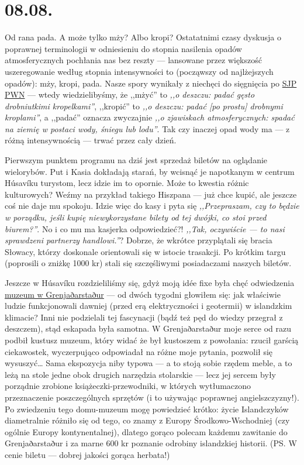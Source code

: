 \chapter*{08.08.}

Od rana pada. A może tylko mży? Albo kropi? Ostatatnimi czasy dyskusja o poprawnej terminologii w odniesieniu do stopnia nasilenia opadów atmosferycznych pochłania nas bez reszty --- lansowane przez większość uszeregowanie według stopnia intensywności to (począwszy od najlżejszych opadów): mży, kropi, pada. Nasze spory wynikały z niechęci do sięgnięcia po \href{http://sjp.pwn.pl/}{SJP PWN} --- wtedy wiedzielibyśmy, że ,,mżyć'' to \emph{,,o deszczu: padać gęsto drobniutkimi kropelkami''}, ,,kropić'' to \emph{,,o deszczu: padać [po prostu] drobnymi kroplami''}, a ,,padać'' oznacza zwyczajnie \emph{,,o zjawiskach atmosferycznych: spadać na ziemię w postaci wody, śniegu lub lodu''}. Tak czy inaczej opad wody ma --- z różną intensywnością --- trwać przez cały dzień.

Pierwszym punktem programu na dziś jest sprzedaż biletów na oglądanie wielorybów. Put i Kasia dokładają starań, by wcisnąć je napotkanym w centrum Húsavíku turystom, lecz idzie im to opornie. Może to kwestia różnic kulturowych? Weźmy na przykład takiego Hiszpana --- już chce kupić, ale jeszcze coś nie daje mu spokoju. Idzie więc do kasy i pyta się \emph{,,Przepraszam, czy to będzie w porządku, jeśli kupię niewykorzystane bilety od tej dwójki, co stoi przed biurem?''}. No i co mu ma kasjerka odpowiedzieć?! \emph{,,Tak, oczywiście --- to nasi sprawdzeni partnerzy handlowi.''}? Dobrze, że wkrótce przyplątali się bracia Słowacy, którzy doskonale orientowali się w istocie trasakcji. Po krótkim targu (poprosili o zniżkę 1000 kr) stali się szczęśliwymi posiadaczami naszych biletów.


Jeszcze w Húsavíku rozdzieliliśmy się, gdyż moją idée fixe była chęć odwiedzenia \href{http://www.visithusavik.com/attractions/the-turf-house-museum/}{muzeum w Grenjaðarstaður} --- od dwóch tygodni głowiłem się: jak właściwie ludzie funkcjonowali dawniej (przed erą elektryczności i geotermii) w islandzkim klimacie? Inni nie podzielali tej fascynacji (bądź też pęd do wiedzy przegrał z deszczem), stąd eskapada była samotna. W Grenjaðarstaður moje serce od razu podbił kustusz muzeum, który widać że był kustoszem z powołania: rzucił garścią ciekawostek, wyczerpująco odpowiadał na różne moje pytania, pozwolił się wysuszyć… Sama ekspozycja niby typowa --- a to stoją sobie rzędem meble, a to leżą na stole jedne obok drugich narzędzia stolarskie --- lecz jej sercem były porządnie zrobione książeczki-przewodniki, w których wytłumaczono przeznaczenie poszczególnych sprzętów (i to używając poprawnej angielszczyzny!). Po zwiedzeniu tego domu-muzeum mogę powiedzieć krótko: życie Islandczyków diametralnie różniło się od tego, co znamy z Europy Środkowo-Wschodniej (czy ogólnie Europy kontynentalnej), dlatego gorąco polecam każdemu zawitanie do Grenjaðarstaður i za marne 600 kr poznanie odrobiny islandzkiej historii. (PS. W cenie biletu --- dobrej jakości gorąca herbata!)


